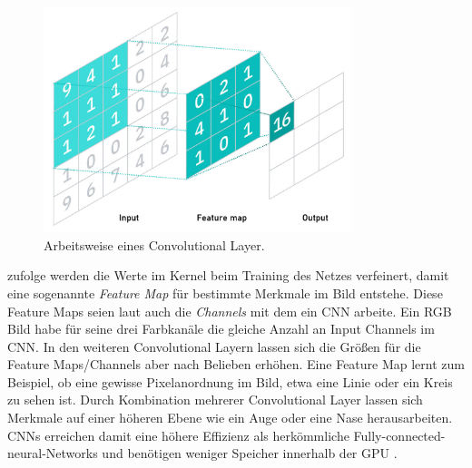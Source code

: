 \begin{figure}[ht]
    \centering
    \includegraphics[width=9cm]{bilder/cnn.jpg}
    \caption{Arbeitsweise eines Convolutional Layer.}
    \label{CNN}
\end{figure}


\citet[133]{tariq_gan} zufolge werden die Werte im Kernel beim Training des Netzes verfeinert, damit eine sogenannte \textit{Feature Map} für bestimmte Merkmale im Bild entstehe. Diese Feature Maps seien laut \citet[]{brownlee-2019} auch die \textit{Channels} mit dem ein CNN arbeite. Ein RGB Bild habe für seine drei Farbkanäle die gleiche Anzahl an Input Channels im CNN. In den weiteren Convolutional Layern lassen sich die Größen für die Feature Maps/Channels aber nach Belieben erhöhen. Eine Feature Map lernt zum Beispiel, ob eine gewisse Pixelanordnung im Bild, etwa eine Linie oder ein Kreis zu sehen ist. Durch Kombination mehrerer Convolutional Layer lassen sich Merkmale auf einer höheren Ebene wie ein Auge oder eine Nase herausarbeiten. CNNs erreichen damit eine höhere Effizienz als herkömmliche Fully-connected-neural-Networks und benötigen weniger Speicher innerhalb der GPU \parencite[154]{tariq_gan}.

